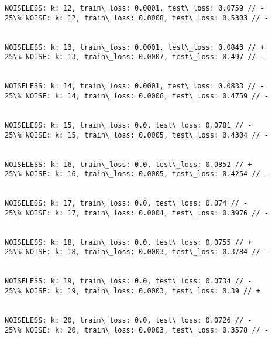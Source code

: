 \documentclass[11pt]{article}
\begin{document}
\begin{Verbatim}[commandchars=\\\{\}]
NOISELESS: k: 12, train\_loss: 0.0001, test\_loss: 0.0759 // -
25\% NOISE: k: 12, train\_loss: 0.0008, test\_loss: 0.5303 // -


NOISELESS: k: 13, train\_loss: 0.0001, test\_loss: 0.0843 // +
25\% NOISE: k: 13, train\_loss: 0.0007, test\_loss: 0.497 // -


NOISELESS: k: 14, train\_loss: 0.0001, test\_loss: 0.0833 // -
25\% NOISE: k: 14, train\_loss: 0.0006, test\_loss: 0.4759 // -


NOISELESS: k: 15, train\_loss: 0.0, test\_loss: 0.0781 // -
25\% NOISE: k: 15, train\_loss: 0.0005, test\_loss: 0.4304 // -


NOISELESS: k: 16, train\_loss: 0.0, test\_loss: 0.0852 // +
25\% NOISE: k: 16, train\_loss: 0.0005, test\_loss: 0.4254 // -


NOISELESS: k: 17, train\_loss: 0.0, test\_loss: 0.074 // -
25\% NOISE: k: 17, train\_loss: 0.0004, test\_loss: 0.3976 // -


NOISELESS: k: 18, train\_loss: 0.0, test\_loss: 0.0755 // +
25\% NOISE: k: 18, train\_loss: 0.0003, test\_loss: 0.3784 // -


NOISELESS: k: 19, train\_loss: 0.0, test\_loss: 0.0734 // -
25\% NOISE: k: 19, train\_loss: 0.0003, test\_loss: 0.39 // +


NOISELESS: k: 20, train\_loss: 0.0, test\_loss: 0.0726 // -
25\% NOISE: k: 20, train\_loss: 0.0003, test\_loss: 0.3578 // -



    \end{Verbatim}
\end{document}
